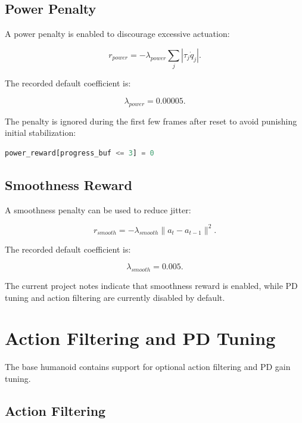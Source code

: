 \documentclass[11pt,a4paper]{article}
\begin{document}
\subsection{Power Penalty}

A power penalty is enabled to discourage excessive actuation:

\begin{equation}
    r_{power} = -\lambda_{power} \sum_j |\tau_j \dot{q}_j|.
\end{equation}

The recorded default coefficient is:

\begin{equation}
    \lambda_{power} = 0.00005.
\end{equation}

The penalty is ignored during the first few frames after reset to avoid punishing initial stabilization:

\begin{lstlisting}[language=Python]
power_reward[progress_buf <= 3] = 0
\end{lstlisting}

\subsection{Smoothness Reward}

A smoothness penalty can be used to reduce jitter:

\begin{equation}
    r_{smooth} = -\lambda_{smooth} \|a_t - a_{t-1}\|^2.
\end{equation}

The recorded default coefficient is:

\begin{equation}
    \lambda_{smooth} = 0.005.
\end{equation}

The current project notes indicate that smoothness reward is enabled, while PD tuning and action filtering are currently disabled by default.

\section{Action Filtering and PD Tuning}

The base humanoid contains support for optional action filtering and PD gain tuning.

\subsection{Action Filtering}
\end{document}
